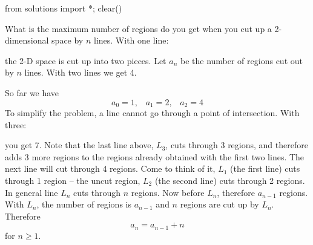 \begin{python0}
from solutions import *; clear() 
\end{python0}

What is the maximum number of regions do you get when you
cut up a 2-dimensional space by $n$ lines.
With one line:

the 2-D space is cut up into two pieces.
Let $a_n$ be the number of regions cut out by $n$ lines.
With two lines we get 4.

So far we have
\[
a_0 = 1, \,\,\,\,\,
a_1 = 2, \,\,\,\,\,
a_2 = 4
\]
To simplify the problem, a line cannot go through a point of
intersection.
With three:

you get 7.
Note that the last line above, $L_3$, cuts through 3 regions,
and therefore adds 3 more
regions to the regions already obtained with the first two lines.
The next line will cut through 4 regions.
Come to think of it, $L_1$ (the first line) cuts through 1 region --
the uncut region,
$L_2$ (the second line) cuts through
2 regions.
In general line $L_n$ cuts through $n$ regions.
Now before $L_n$, therefore $a_{n-1}$ regions.
With $L_n$, the number of regions is $a_{n-1}$ and
$n$ regions are cut up by $L_n$. 
Therefore
\[
a_n = a_{n-1} + n
\]
for $n \geq 1$.




